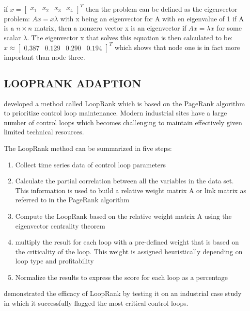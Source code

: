 if $x = \begin{bmatrix} x_{1} & x_{2} & x_{3} & x_{4} \end{bmatrix} ^{T}$ then the problem can be defined as the eigenvector problem:
\newline $Ax = x \lambda$ 
\newline with x being an eigenvector for A with en eigenvalue of 1
\newline if A is a $n\times n$ matrix, then a nonzero vector x is an eigenvector if $Ax = \lambda x$ for some scalar $\lambda$. The eigenvector x that solves this equation is then calculated to be:
\newline $x \approx \begin{bmatrix} 0.387 & 0.129 & 0.290 & 0.194\end{bmatrix}^{T}$
which shows that node one is in fact more important than node three.

\subsection{LOOPRANK ADAPTION}

\cite{farenzena2009looprank} developed a method called LoopRank which is based on the PageRank algorithm to prioritize control loop maintenance. Modern industrial sites have a large number of control loops which becomes challenging to maintain effectively given limited technical resources. 

The LoopRank method can be summarized in five steps:
\begin{enumerate}
	\item Collect time series data of control loop parameters
	\item Calculate the partial correlation between all the variables in the data set. This information is used to build a relative weight matrix A or link matrix as referred to in the PageRank algorithm
	\item Compute the LoopRank based on the relative weight matrix A using the eigenvector centrality theorem
	\item multiply the result for each loop with a pre-defined weight that is based on the criticality of the loop. This weight is assigned heuristically depending on loop type and profitability
	\item Normalize the results to express the score for each loop as a percentage
\end{enumerate}

\cite{farenzena2009looprank} demonstrated the efficacy of LoopRank by testing it on an industrial case study in which it successfully flagged the most critical control loops.

